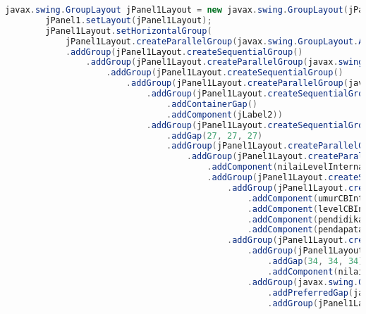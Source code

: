 \begin{lstlisting}[language=Java, caption=TampilanBobotKetetanggaan.java]
        javax.swing.GroupLayout jPanel1Layout = new javax.swing.GroupLayout(jPanel1);
        jPanel1.setLayout(jPanel1Layout);
        jPanel1Layout.setHorizontalGroup(
            jPanel1Layout.createParallelGroup(javax.swing.GroupLayout.Alignment.LEADING)
            .addGroup(jPanel1Layout.createSequentialGroup()
                .addGroup(jPanel1Layout.createParallelGroup(javax.swing.GroupLayout.Alignment.LEADING)
                    .addGroup(jPanel1Layout.createSequentialGroup()
                        .addGroup(jPanel1Layout.createParallelGroup(javax.swing.GroupLayout.Alignment.LEADING)
                            .addGroup(jPanel1Layout.createSequentialGroup()
                                .addContainerGap()
                                .addComponent(jLabel2))
                            .addGroup(jPanel1Layout.createSequentialGroup()
                                .addGap(27, 27, 27)
                                .addGroup(jPanel1Layout.createParallelGroup(javax.swing.GroupLayout.Alignment.LEADING)
                                    .addGroup(jPanel1Layout.createParallelGroup(javax.swing.GroupLayout.Alignment.TRAILING)
                                        .addComponent(nilaiLevelInternal, javax.swing.GroupLayout.PREFERRED_SIZE, 53, javax.swing.GroupLayout.PREFERRED_SIZE)
                                        .addGroup(jPanel1Layout.createSequentialGroup()
                                            .addGroup(jPanel1Layout.createParallelGroup(javax.swing.GroupLayout.Alignment.LEADING)
                                                .addComponent(umurCBInternal)
                                                .addComponent(levelCBInternal)
                                                .addComponent(pendidikanCBInternal)
                                                .addComponent(pendapatanCBInternal))
                                            .addGroup(jPanel1Layout.createParallelGroup(javax.swing.GroupLayout.Alignment.LEADING)
                                                .addGroup(jPanel1Layout.createSequentialGroup()
                                                    .addGap(34, 34, 34)
                                                    .addComponent(nilaiUmurInternal, javax.swing.GroupLayout.PREFERRED_SIZE, 53, javax.swing.GroupLayout.PREFERRED_SIZE))
                                                .addGroup(javax.swing.GroupLayout.Alignment.TRAILING, jPanel1Layout.createSequentialGroup()
                                                    .addPreferredGap(javax.swing.LayoutStyle.ComponentPlacement.RELATED)
                                                    .addGroup(jPanel1Layout.createParallelGroup(javax.swing.GroupLayout.Alignment.LEADING)

\end{lstlisting}
